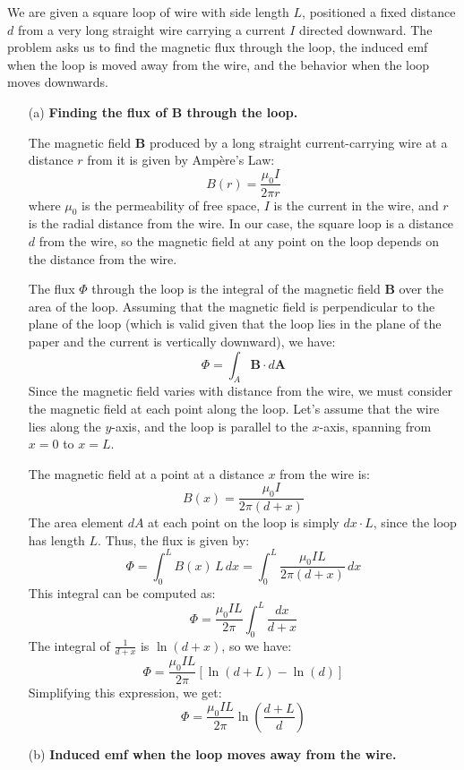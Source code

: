 \documentclass{article}
\begin{document}
We are given a square loop of wire with side length $L$, positioned a fixed distance $d$ from a very long straight wire carrying a current $I$ directed downward. The problem asks us to find the magnetic flux through the loop, the induced emf when the loop is moved away from the wire, and the behavior when the loop moves downwards.

\begin{enumerate}
    \item[(a)] \textbf{Finding the flux of $\mathbf{B}$ through the loop.}
    
    The magnetic field $\mathbf{B}$ produced by a long straight current-carrying wire at a distance $r$ from it is given by Ampère's Law:
    \[
    B(r) = \frac{\mu_0 I}{2\pi r}
    \]
    where $\mu_0$ is the permeability of free space, $I$ is the current in the wire, and $r$ is the radial distance from the wire. In our case, the square loop is a distance $d$ from the wire, so the magnetic field at any point on the loop depends on the distance from the wire.

    The flux $\Phi$ through the loop is the integral of the magnetic field $\mathbf{B}$ over the area of the loop. Assuming that the magnetic field is perpendicular to the plane of the loop (which is valid given that the loop lies in the plane of the paper and the current is vertically downward), we have:
    \[
    \Phi = \int_{A} \mathbf{B} \cdot d\mathbf{A}
    \]
    Since the magnetic field varies with distance from the wire, we must consider the magnetic field at each point along the loop. Let’s assume that the wire lies along the $y$-axis, and the loop is parallel to the $x$-axis, spanning from $x = 0$ to $x = L$.

    The magnetic field at a point at a distance $x$ from the wire is:
    \[
    B(x) = \frac{\mu_0 I}{2\pi (d+x)}
    \]
    The area element $dA$ at each point on the loop is simply $dx \cdot L$, since the loop has length $L$. Thus, the flux is given by:
    \[
    \Phi = \int_0^L B(x) \, L \, dx = \int_0^L \frac{\mu_0 I L}{2\pi (d+x)} \, dx
    \]
    This integral can be computed as:
    \[
    \Phi = \frac{\mu_0 I L}{2\pi} \int_0^L \frac{dx}{d+x}
    \]
    The integral of $\frac{1}{d+x}$ is $\ln(d+x)$, so we have:
    \[
    \Phi = \frac{\mu_0 I L}{2\pi} \left[ \ln(d+L) - \ln(d) \right]
    \]
    Simplifying this expression, we get:
    \[
    \Phi = \frac{\mu_0 I L}{2\pi} \ln \left( \frac{d+L}{d} \right)
    \]

    \item[(b)] \textbf{Induced emf when the loop moves away from the wire.}
    

\end{enumerate}
\end{document}
